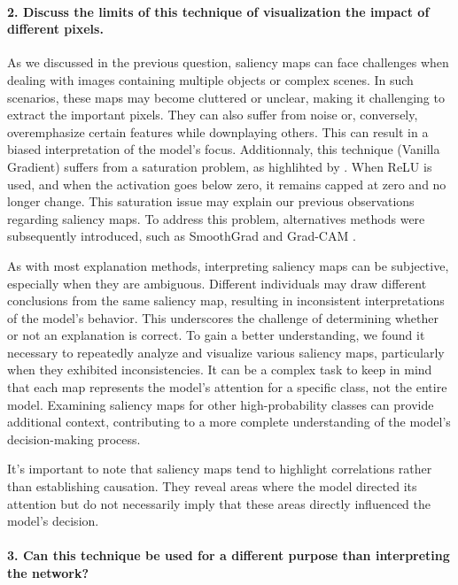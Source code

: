 
\paragraph*{2. Discuss the limits of this technique of visualization the impact of different pixels.}
As we discussed in the previous question, saliency maps can face challenges when dealing with images containing multiple objects or complex scenes. In such scenarios, these maps may become cluttered or unclear, making it challenging to extract the important pixels. They can also suffer from noise or, conversely, overemphasize certain features while downplaying others. This can result in a biased interpretation of the model's focus. Additionnaly, this technique (Vanilla Gradient) suffers from a saturation problem, as highlihted by \cite{shrikumar2019learning}. When ReLU is used, and when the activation goes below zero, it remains capped at zero and no longer change. This saturation issue may explain our previous observations regarding saliency maps. To address this problem, alternatives methods were subsequently introduced, such as SmoothGrad \citep{smilkov2017smoothgrad} and Grad-CAM \citep{Selvaraju_2019}.

As with most explanation methods, interpreting saliency maps can be subjective, especially when they are ambiguous. Different individuals may draw different conclusions from the same saliency map, resulting in inconsistent interpretations of the model's behavior. This underscores the challenge of determining whether or not an explanation is correct. To gain a better understanding, we found it necessary to repeatedly analyze and visualize various saliency maps, particularly when they exhibited inconsistencies. It can be a complex task to keep in mind that each map represents the model's attention for a specific class, not the entire model. Examining saliency maps for other high-probability classes can provide additional context, contributing to a more complete understanding of the model's decision-making process. 

It's important to note that saliency maps tend to highlight correlations rather than establishing causation. They reveal areas where the model directed its attention but do not necessarily imply that these areas directly influenced the model's decision.

\paragraph*{3. Can this technique be used for a different purpose than interpreting the network?}

